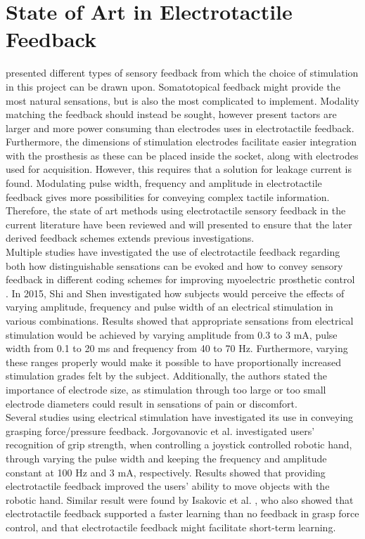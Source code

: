 \section{State of Art in Electrotactile Feedback} \label{SoA}

 presented different types of sensory feedback from which the choice of stimulation in this project can be drawn upon. Somatotopical feedback might provide the most natural sensations, but is also the most complicated to implement. Modality matching the feedback should instead be sought, however present tactors are larger and more power consuming than electrodes uses in electrotactile feedback. Furthermore, the dimensions of stimulation electrodes facilitate easier integration with the prosthesis as these can be placed inside the socket, along with electrodes used for acquisition. However, this requires that a solution for leakage current is found. Modulating pulse width, frequency and amplitude in electrotactile feedback gives more possibilities for conveying complex tactile information. Therefore, the state of art methods using electrotactile sensory feedback in the current literature have been reviewed and will presented to ensure that the later derived feedback schemes extends previous investigations. \\
Multiple studies have investigated the use of electrotactile feedback regarding both how distinguishable sensations can be evoked and how to convey sensory feedback in different coding schemes for improving myoelectric prosthetic control \cite{Stephens-Fripp2018}. 
In 2015, Shi and Shen \cite{Shi2015} investigated how subjects would perceive the effects of varying amplitude, frequency and pulse width of an electrical stimulation in various combinations. Results showed that appropriate sensations from electrical stimulation would be achieved by varying amplitude from 0.3 to 3 mA, pulse width from 0.1 to 20 ms and frequency from 40 to 70 Hz. Furthermore, varying these ranges properly would make it possible to have proportionally increased stimulation grades felt by the subject. Additionally, the authors stated the importance of electrode size, as stimulation through too large or too small electrode diameters could result in sensations of pain or discomfort. \cite{Shi2015} \\         
Several studies \cite{Pamungkas2015,Xu2016,Jorgovanovic2014,Isakovic2016} using electrical stimulation have investigated its use in conveying grasping force/pressure feedback. Jorgovanovic et al. \cite{Jorgovanovic2014} investigated users' recognition of grip strength, when controlling a joystick controlled robotic hand, through varying the pulse width and keeping the frequency and amplitude constant at 100 Hz and 3 mA, respectively. Results showed that providing electrotactile feedback improved the users' ability to move objects with the robotic hand. \cite{Jorgovanovic2014} Similar result were found by Isakovic et al. \cite{Isakovic2016}, who also showed that electrotactile feedback supported a faster learning than no feedback in grasp force control, and that electrotactile feedback might facilitate short-term learning. \\ 
